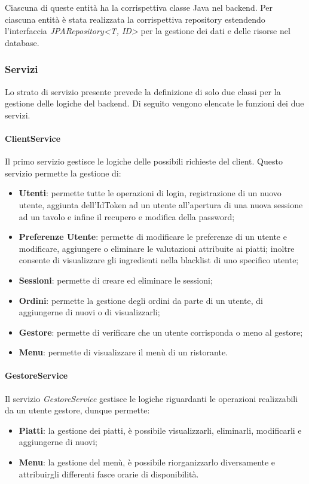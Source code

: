Ciascuna di queste entità ha la corrispettiva classe Java nel backend. Per ciascuna entità è stata realizzata la corrispettiva repository estendendo l'interfaccia \textit{JPARepository<T, ID>} per la gestione dei dati e delle risorse nel database.
\subsubsection*{Servizi}
Lo strato di servizio presente prevede la definizione di solo due classi per la gestione delle logiche del backend. Di seguito vengono elencate le funzioni dei due servizi.
\paragraph{ClientService}
Il primo servizio gestisce le logiche delle possibili richieste del client. Questo servizio permette la gestione di:
\begin{itemize}
  \item \textbf{Utenti}: permette tutte le operazioni di login, registrazione di un nuovo utente, aggiunta dell'IdToken ad un utente all'apertura di una nuova sessione ad un tavolo e infine il recupero e modifica della password;
  \item \textbf{Preferenze Utente}: permette di modificare le preferenze di un utente e modificare, aggiungere o eliminare le valutazioni attribuite ai piatti; inoltre consente di visualizzare gli ingredienti nella blacklist di uno specifico utente;
  \item \textbf{Sessioni}: permette di creare ed eliminare le sessioni;
  \item \textbf{Ordini}: permette la gestione degli ordini da parte di un utente, di aggiungerne di nuovi o di visualizzarli;
  \item \textbf{Gestore}: permette di verificare che un utente corrisponda o meno al gestore;
  \item \textbf{Menu}: permette di visualizzare il menù di un ristorante.
\end{itemize}
\paragraph{GestoreService}
Il servizio \textit{GestoreService} gestisce le logiche riguardanti le operazioni realizzabili da un utente gestore, dunque permette:
\begin{itemize}
  \item \textbf{Piatti}: la gestione dei piatti, è possibile visualizzarli, eliminarli, modificarli e aggiungerne di nuovi;
  \item \textbf{Menu}: la gestione del menù, è possibile riorganizzarlo diversamente e attribuirgli differenti fasce orarie di disponibilità.
\end{itemize}
